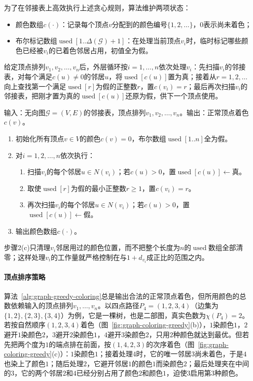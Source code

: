 为了在邻接表上高效执行上述贪心规则，算法维护两项状态：
\begin{itemize}
  \item 颜色数组$c(\cdot)$：记录每个顶点$v$分配到的颜色编号$\{1,2,\ldots\}$，$0$表示尚未着色；
  \item 布尔标记数组$\operatorname{used}[1..\Delta(\mathcal G)+1]$：在处理当前顶点$v_i$时，临时标记哪些颜色已经被$v_i$的已着色邻居占用，初值全为假。
\end{itemize}

给定顶点排列$v_1,v_2,\ldots,v_n$后，外层循环按$i=1,\ldots,n$依次处理$v_i$：先扫描$v_i$的邻接表，对每个满足$c(u)\neq 0$的邻居$u$，将$\operatorname{used}[c(u)]$置为真；接着从$r=1,2,\ldots$向上查找第一个满足$\operatorname{used}[r]$为假的正整数$r$，置$c(v_i)=r$；最后再次扫描$v_i$的邻接表，把刚才置为真的$\operatorname{used}[c(u)]$还原为假，供下一个顶点使用。

\begin{algorithm}[贪心顶点着色算法]
\label{alg:graph-greedy-coloring}
输入：无向图$\mathcal G=(V,E)$的邻接表，顶点排列$v_1,v_2,\ldots,v_n$。输出：正常顶点着色$c(v)$。
\begin{enumerate}
  \item 初始化所有顶点$v\in V$的颜色$c(v)=0$，布尔数组$\operatorname{used}[1..n]$全为假。
  \item 对$i=1,2,\ldots,n$依次执行：
  \begin{enumerate}
    \item 扫描$v_i$的每个邻居$u\in N(v_i)$；若$c(u)>0$，置$\operatorname{used}[c(u)]\gets\text{真}$。
    \item 取使$\operatorname{used}[r]$为假的最小正整数$r\geq 1$，置$c(v_i)=r$。
    \item 再次扫描$v_i$的每个邻居$u\in N(v_i)$；若$c(u)>0$，置$\operatorname{used}[c(u)]\gets\text{假}$。
  \end{enumerate}
  \item 输出颜色数组$c(\cdot)$。
\end{enumerate}
\end{algorithm}

步骤2(c)只清理$v_i$邻居用过的颜色位置，而不把整个长度为$n$的$\operatorname{used}$数组全部清零；这样处理$v_i$的工作量就严格控制在与$1+d_{v_i}$成正比的范围之内。

\paragraph{顶点排序策略}
算法~\ref{alg:graph-greedy-coloring}总是输出合法的正常顶点着色，但所用颜色的总数依赖输入的顶点排列$v_1,\ldots,v_n$。以四点路径$P_4=(1,2,3,4)$（边集为$\{1,2\},\{2,3\},\{3,4\}$）为例，它是一棵树，也是二部图，真实色数为$\chi(P_4)=2$。若按自然顺序$(1,2,3,4)$着色（图~\ref{fig:graph-coloring-greedy}(b)），$1$染颜色$1$，$2$避开$1$染颜色$2$，$3$避开$2$染颜色$1$，$4$避开$3$染颜色$2$，只用$2$种颜色就达到最优。但若先把两个度为$1$的端点排在前面，按$(1,4,2,3)$的次序着色（图~\ref{fig:graph-coloring-greedy}(c)）：$1$染颜色$1$；接着处理$4$时，它的唯一邻居$3$尚未着色，于是$4$也染上了颜色$1$；随后处理$2$，它避开邻居$1$的颜色$1$而染颜色$2$；最后处理夹在中间的$3$，它的两个邻居$2$和$4$已经分别占用了颜色$2$和颜色$1$，迫使$3$启用第$3$种颜色。

